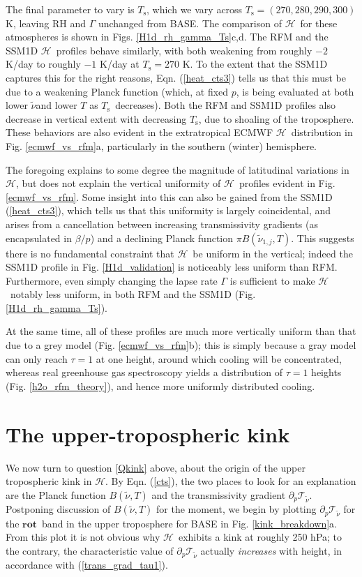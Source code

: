 \documentclass{ametsoc}
\newcommand{\eqnref}[1]{(\ref{#1})}
\newcommand{\ppp}{\ensuremath{\partial_p}}
\newcommand{\Ts}{\ensuremath{T_\mathrm{s}}}
\newcommand{\RH}{\ensuremath{\mathrm{RH}}}
\newcommand{\wv}{\ensuremath{\widetilde{\nu}}}
\newcommand{\trans}{\ensuremath{\mathcal{T}}}
\newcommand{\ch}{\ensuremath{\mathcal{H}}}
\newcommand{\konej}{\ensuremath{\wv_{1,j}}}
\newcommand{\rot}{\ensuremath{\textbf{rot}}}
\begin{document}
The final parameter to vary is \Ts, which we vary across $\Ts=(270,280,290,300)$ K, leaving $\RH$ and $\Gamma$ unchanged from BASE. The comparison of \ch\ for these atmospheres is shown in Figs. \ref{H1d_rh_gamma_Ts}c,d. The RFM and the SSM1D \ch\ profiles behave similarly, with both weakening  from roughly  $-2$ K/day to roughly $-1$ K/day at  $\Ts=270$ K. To the extent that the SSM1D captures this for the right reasons, Eqn. \eqnref{heat_cts3} tells us that this must be due to a weakening Planck function (which, at fixed $p$, is being evaluated at both lower \wv and lower $T$ as \Ts\ decreases). Both the RFM and SSM1D profiles also decrease in vertical extent with decreasing \Ts, due to shoaling of the troposphere. These behaviors are also evident in the extratropical ECMWF \ch\ distribution in Fig. \ref{ecmwf_vs_rfm}a, particularly in the southern (winter) hemisphere. 

The foregoing explains to some degree the magnitude of latitudinal variations in \ch, but does not explain the vertical uniformity of  \ch\ profiles evident in Fig. \ref{ecmwf_vs_rfm}. Some insight into this can also be gained from the SSM1D \eqnref{heat_cts3}, which tells us that this uniformity is largely coincidental, and arises from a cancellation between increasing  transmissivity gradients (as encapsulated in $\beta/p$) and a declining Planck function $\pi B(\konej,T)$. This suggests there is no fundamental constraint that \ch\ be uniform in the vertical; indeed the SSM1D profile in Fig. \ref{H1d_validation} is noticeably less uniform than RFM. Furthermore, even simply changing the lapse rate $\Gamma$ is sufficient to make \ch\ notably less uniform, in both RFM and the SSM1D (Fig. \ref{H1d_rh_gamma_Ts}). 

  At the same time, all of these profiles are much more vertically uniform than that due to a grey model (Fig. \ref{ecmwf_vs_rfm}b); this is simply because a gray model can only reach $\tau=1$ at one height, around which cooling will be concentrated, whereas real greenhouse gas spectroscopy yields a distribution of $\tau=1$ heights (Fig. \ref{h2o_rfm_theory}), and hence more uniformly distributed cooling. 
  
\section{The upper-tropospheric kink} \label{sec_kink}
  We now turn to question \ref{Qkink} above, about the origin of the upper tropospheric kink in \ch. By Eqn. \eqnref{cts}, the two places to look for an explanation are the Planck function $B(\wv,T)$ and  the transmissivity gradient $\ppp \trans_{\wv}$. Postponing discussion of $B(\wv,T)$ for the moment, we begin by  plotting $\ppp \trans_{\wv}$ for the \rot\ band in the upper troposphere for BASE in Fig. \ref{kink_breakdown}a. From this plot it is not obvious why \ch\ exhibits a kink at roughly 250 hPa; to the contrary,  the characteristic value of $\ppp \trans_{\wv}$ actually \emph{increases} with height, in accordance with \eqnref{trans_grad_tau1}. 
  
\end{document}
